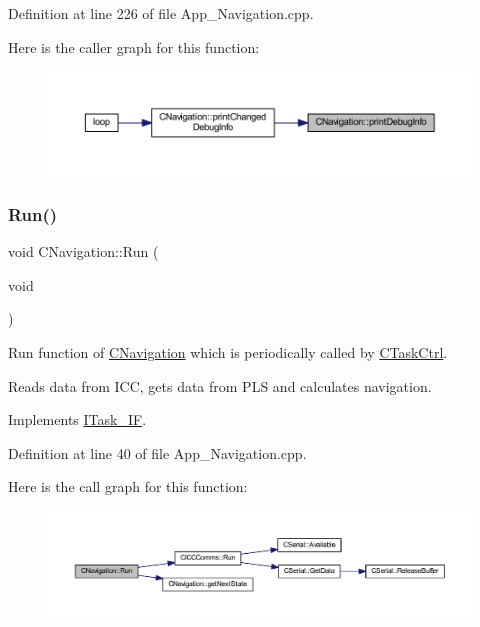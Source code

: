 Definition at line 226 of file App\+\_\+\+Navigation.\+cpp.

Here is the caller graph for this function\+:
\nopagebreak
\begin{figure}[H]
\begin{center}
\leavevmode
\includegraphics[width=350pt]{class_c_navigation_a84e320cd8975593ab6f966e8794b2886_icgraph}
\end{center}
\end{figure}
\mbox{\label{class_c_navigation_a86acb1521aab400e542465c8eabed671}} 
\subsubsection{\texorpdfstring{Run()}{Run()}}
{\footnotesize\ttfamily void C\+Navigation\+::\+Run (\begin{DoxyParamCaption}\item[{void}]{ }\end{DoxyParamCaption})\hspace{0.3cm}{\ttfamily [virtual]}}



Run function of \mbox{\hyperlink{class_c_navigation}{C\+Navigation}} which is periodically called by \mbox{\hyperlink{class_c_task_ctrl}{C\+Task\+Ctrl}}. 

Reads data from I\+CC, gets data from P\+LS and calculates navigation. 

Implements \mbox{\hyperlink{class_i_task___i_f_ab73cc5879a61d00fc59b72cce32cc6f7}{I\+Task\+\_\+\+IF}}.



Definition at line 40 of file App\+\_\+\+Navigation.\+cpp.

Here is the call graph for this function\+:
\nopagebreak
\begin{figure}[H]
\begin{center}
\leavevmode
\includegraphics[width=350pt]{class_c_navigation_a86acb1521aab400e542465c8eabed671_cgraph}
\end{center}
\end{figure}
\mbox{\label{class_c_navigation_a53f0409677e36f62ef232f7e15b32948}} 
